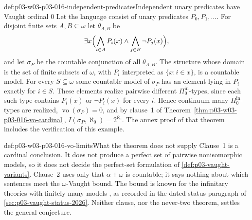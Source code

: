 \begin{hbexample}{def:p03-w03-p03-016-independent-predicates}{Independent unary predicates have Vaught ordinal \(0\)}
Let the language consist of unary predicates \(P_0,P_1,\ldots\). For
disjoint finite sets \(A,B\subseteq\omega\) let \(\theta_{A,B}\) be
\[
 \exists x\Bigl(\bigwedge_{i\in A}P_i(x)\wedge
                 \bigwedge_{j\in B}\neg P_j(x)\Bigr),
\]
and let \(\sigma_P\) be the countable conjunction of all \(\theta_{A,B}\).
The structure whose domain is the set of finite subsets of \(\omega\), with
\(P_i\) interpreted as \(\{x:i\in x\}\), is a countable model. For every
\(S\subseteq\omega\) some countable model of \(\sigma_P\) has an element
lying in \(P_i\) exactly for \(i\in S\). These elements realize pairwise
different \(\Pi^{\mathrm{in}}_0\)-types, since each such type contains
\(P_i(x)\) or \(\neg P_i(x)\) for every \(i\). Hence continuum many
\(\Pi^{\mathrm{in}}_0\)-types are realized,
\(\operatorname{vo}(\sigma_P)=0\), and by clause~1 of
Theorem~\ref{thm:p03-w03-p03-016-vo-cardinal},
\(I(\sigma_P,\aleph_0)=2^{\aleph_0}\). The annex proof of that theorem
includes the verification of this example.
\end{hbexample}

\begin{hbwarning}{def:p03-w03-p03-016-vo-limits}{What the theorem does not supply}
Clause~1 is a cardinal conclusion. It does not produce a perfect set of
pairwise nonisomorphic models, so it does not decide the perfect-set
formulation of \cref{def:p03-vaught-variants}. Clause~2 uses only that
\(\alpha+\omega\) is countable; it says nothing about which sentences meet
the \(\omega\)-Vaught bound. The bound is known for the infinitary theories
with finitely many models \cite[p.~4, Corollary~4.10]{GonzalezRosseggerTuretsky2026Status},
as recorded in the dated status paragraph of
\cref{sec:p03-vaught-status-2026}. Neither clause, nor the never-two
theorem, settles the general conjecture.
\end{hbwarning}
